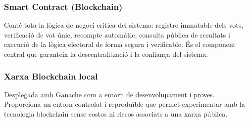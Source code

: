 \documentclass[12pt,a4paper,catalan]{article}
\begin{document}
\subsubsection*{Smart Contract (Blockchain)}
Conté tota la lògica de negoci crítica del sistema: registre immutable dels vots, verificació de vot únic, recompte automàtic, consulta pública de resultats i execució de la lògica electoral de forma segura i verificable. És el component central que garanteix la descentralització i la confiança del sistema.

\subsubsection*{Xarxa Blockchain local}
Desplegada amb Ganache com a entorn de desenvolupament i proves. Proporciona un entorn controlat i reproduïble que permet experimentar amb la tecnologia blockchain sense costos ni riscos associats a una xarxa pública.
\end{document}
